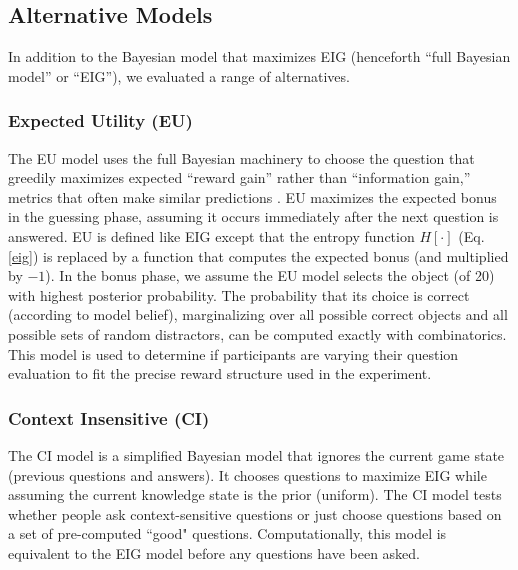 \documentclass[11pt,letterpaper]{article}
\begin{document}
\subsection*{Alternative Models}

In addition to the Bayesian model that maximizes EIG (henceforth ``full Bayesian model'' or ``EIG''), we evaluated a range of alternatives.

\subsubsection*{Expected Utility (EU)}
The EU model uses the full Bayesian machinery to choose the question that greedily maximizes expected ``reward gain'' rather than ``information gain,'' metrics that often make similar predictions \cite{Markant2012a}.
EU maximizes the expected bonus in the guessing phase, assuming it occurs immediately after the next question is answered.
EU is defined like EIG except that the entropy function $H[\cdot]$ (Eq. \ref{eig}) is replaced by a function that computes the expected bonus (and multiplied by $-1$).
In the bonus phase, we assume the EU model selects the object (of 20) with highest posterior probability.
The probability that its choice is correct (according to model belief), marginalizing over all possible correct objects and all possible sets of random distractors, can be computed exactly with combinatorics.
This model is used to determine if participants are varying their question evaluation to fit the precise reward structure used in the experiment. 

\subsubsection*{Context Insensitive (CI)}
The CI model is a simplified Bayesian model that ignores the current game state (previous questions and answers).
It chooses questions to maximize EIG while assuming the current knowledge state is the prior (uniform).
The CI model tests whether people ask context-sensitive questions or just choose questions based on a set of pre-computed ``good" questions.
Computationally, this model is equivalent to the EIG model before any questions have been asked.
\end{document}
